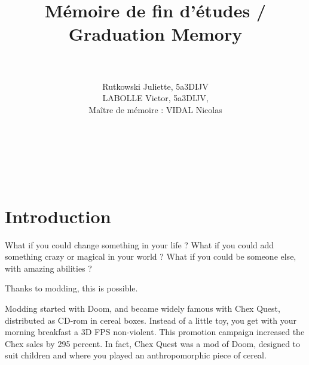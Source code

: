 \documentclass[a4paper,12pt]{article}
\begin{document}
\thispagestyle{empty}
\sffamily

\author{Rutkowski Juliette, 5a3DIJV \\ LABOLLE Victor, 5a3DIJV,\\Maître de mémoire : VIDAL Nicolas}
\title{{\Huge Mémoire de fin d'études / Graduation Memory }\\\\\vspace*{3cm}{\large How to make a moddable game and why should I do that ? }}
\maketitle
~

\newpage ~\newpage
{}
\newpage ~\newpage


\section{Introduction}

What if you could change something in your life ? What if you could add something crazy or magical in your world ? What if you could be someone else, with amazing abilities ?

Thanks to modding, this is possible.

Modding started with Doom, and became widely famous with Chex Quest, distributed as CD-rom in cereal boxes. Instead of a little toy, you get with your morning breakfast a 3D FPS non-violent. This promotion campaign increased the Chex sales by 295 percent. In fact, Chex Quest was a mod of Doom, designed to suit children and where you played an anthropomorphic piece of cereal.
\end{document}
